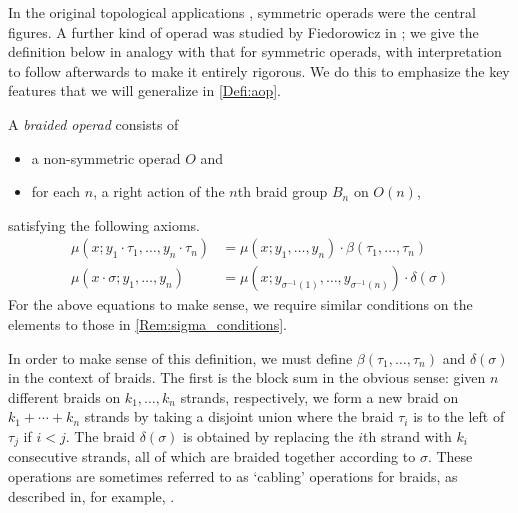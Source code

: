 In the original topological applications \cite{maygeom}, symmetric operads were the central figures. A further kind of operad was studied by Fiedorowicz in \cite{fie-br}; we give the definition below in analogy with that for symmetric operads, with interpretation to follow afterwards to make it entirely rigorous. We do this to emphasize the key features that we will generalize in \cref{Defi:aop}.

\begin{Defi}\label{broperad}
A \textit{braided operad} consists of
  \begin{itemize}
    \item a non-symmetric operad $O$ and
    \item for each $n$, a right action of the $n$th braid group $B_{n}$ on $O(n)$,
  \end{itemize}
satisfying the following axioms.
  \begin{align*}
    \mu(x;y_1 \cdot \tau_1,\ldots,y_n \cdot \tau_n) &= \mu(x;y_1,\ldots,y_n)\cdot\beta(\tau_1,\ldots,\tau_n)\\
    \mu(x \cdot \sigma; y_1, \ldots, y_n) &= \mu\left(x;y_{\sigma^{-1}(1)},\ldots,y_{\sigma^{-1}(n)}\right)\cdot \delta(\sigma)
  \end{align*}
For the above equations to make sense, we require similar conditions on the elements to those in \cref{Rem:sigma_conditions}.
\end{Defi}

In order to make sense of this definition, we must define $\beta(\tau_1,\ldots,\tau_n)$ and $\delta(\sigma)$ in the context of braids. The first is the block sum in the obvious sense:  given $n$ different braids on $k_{1}, \ldots, k_{n}$ strands, respectively, we form a new braid on $k_{1} + \cdots + k_{n}$ strands by taking a disjoint union where the braid $\tau_{i}$ is to the left of $\tau_{j}$ if $i < j$. The braid $\delta(\sigma)$ is obtained by replacing the $i$th strand with $k_{i}$ consecutive strands, all of which are braided together according to $\sigma$. These operations are sometimes referred to as `cabling' operations for braids, as described in, for example, \cite{doucot_local_2025}.

